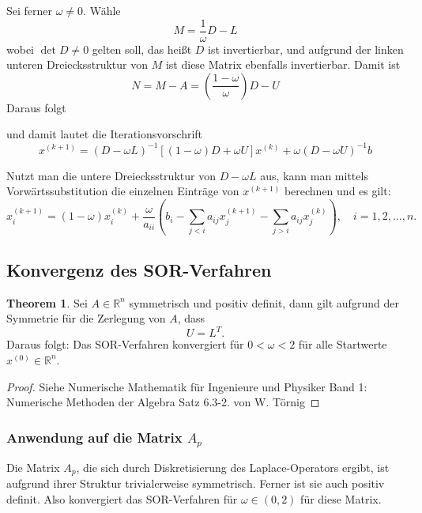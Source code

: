 \documentclass{scrartcl}
\theoremstyle{definition}
\newtheorem{theorem}{Theorem}
\begin{document}
Sei ferner \(\omega \neq 0\).
Wähle \[M = \frac{1}{\omega}D-L\] 
wobei \(\operatorname{det}D \neq 0\) gelten soll, das heißt \(D\) ist invertierbar, 
und aufgrund der linken unteren Dreiecksstruktur von \(M\)
ist diese Matrix ebenfalls invertierbar.
Damit ist \[N= M-A=(\frac{1-\omega}{\omega})D-U\]
Daraus folgt

und damit lautet die Iterationsvorschrift
\[x^{(k+1)}=(D - \omega L)^{-1}[(1- \omega)D + \omega U]x^{(k)} + \omega (D-\omega U)^{-1}b\]








Nutzt man die untere Dreiecksstruktur von \(D - \omega L\) aus, kann man mittels Vorwärtssubstitution die einzelnen 
Einträge von \(x^{(k+1)}\) berechnen und es gilt:
\[
x_i^{(k+1)} = (1 - \omega) x_i^{(k)} + \frac{\omega}{a_{ii}} 
\left( b_i - \sum_{j < i} a_{ij} x_j^{(k+1)} - \sum_{j > i} a_{ij} x_j^{(k)} \right), 
\quad i = 1, 2, \ldots, n.
\]

\subsection{Konvergenz des SOR-Verfahren}
\begin{theorem}
Sei \(A \in \mathbb{R}^n\) symmetrisch und positiv definit, dann gilt aufgrund der Symmetrie
für die Zerlegung von \(A\), dass
\[U = L^T.\]
Daraus folgt: Das SOR-Verfahren konvergiert für \(0 < \omega < 2\) für alle Startwerte \(x^{(0)} \in \mathbb{R}^n\).

\end{theorem}

\begin{proof}
   Siehe Numerische Mathematik für Ingenieure und Physiker
Band 1: Numerische Methoden der Algebra Satz 6.3-2. von W. Törnig 
\end{proof}


\subsubsection{Anwendung auf die Matrix \(A_{p}\)}
Die Matrix \(A_p\), die sich durch Diskretisierung des Laplace-Operators ergibt, ist aufgrund ihrer Struktur trivialerweise symmetrisch. Ferner ist sie auch positiv definit\cite{something}.
Also konvergiert das SOR-Verfahren für \(\omega \in (0, 2)\) für diese Matrix.
\end{document}
